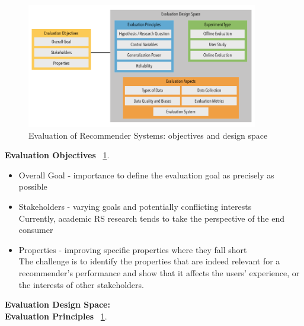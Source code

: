 \documentclass[\myFontSize,oneside,english,hidelinks,a4paper]{article}
\begin{document}
%
%
%
\begin{figure}[h!]
    \centering
    \includegraphics[width=0.9\textwidth]{img/evaluation_figure.png}
    \caption{Evaluation of Recommender Systems: objectives and design space \cite{Zangerle2023}}
    \label{fig:evaluation}
\end{figure}
%
%
%
\textbf{Evaluation Objectives} ~\ref{fig:evaluation}.
%
\begin{itemize}
\item Overall Goal - importance to define the evaluation goal as precisely as possible
\item Stakeholders - varying goals and potentially conflicting interests\\
Currently, academic RS research tends to take the perspective of the end consumer
\item Properties - improving specific properties where they fall short \\
The challenge is to identify the properties that are indeed relevant for a recommender’s performance and show that it affects the users’ experience, or the interests of other stakeholders. 
\end{itemize}
%
%
%
\textbf{Evaluation Design Space:\\ Evaluation Principles} ~\ref{fig:evaluation}.
%
\end{document}
